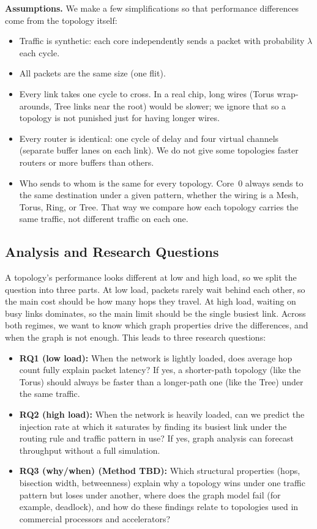 \documentclass[conference]{IEEEtran}
\begin{document}
\textbf{Assumptions.} We make a few simplifications so that
performance differences come from the topology itself:
\begin{itemize}
  \item Traffic is synthetic: each core independently sends a packet
  with probability $\lambda$ each cycle.
  \item All packets are the same size (one flit).
  \item Every link takes one cycle to cross. In a real chip, long wires
  (Torus wrap-arounds, Tree links near the root) would be slower; we
  ignore that so a topology is not punished just for having longer
  wires.
  \item Every router is identical: one cycle of delay and four virtual
  channels (separate buffer lanes on each link). We do not give some
  topologies faster routers or more buffers than others.
    \item Who sends to whom is the same for every topology. Core~0 always
  sends to the same destination under a given pattern, whether the
  wiring is a Mesh, Torus, Ring, or Tree. That way we compare how each
  topology carries the same traffic, not different traffic on each one.
\end{itemize}

\subsection{Analysis and Research Questions}


A topology's performance looks different at low and high load, so we split the question into three parts. At low load, packets rarely wait behind each other, so the main cost should be how many hops they travel. At high load, waiting on busy links dominates, so the main limit should be the single busiest link. Across both regimes, we want to know which graph properties drive the differences, and when the graph is not enough. This leads to three research questions:
\begin{itemize}
  \item \textbf{RQ1 (low load):} When the network is lightly loaded,
  does average hop count fully explain packet latency? If yes, a
  shorter-path topology (like the Torus) should always be faster than a longer-path one (like the Tree) under the same traffic.
  \item \textbf{RQ2 (high load):} When the network is heavily loaded, can we predict the injection rate at which it saturates by finding its busiest link under the routing rule and traffic pattern in use? If yes, graph analysis can forecast throughput without a full
  simulation.
\item \textbf{RQ3 (why/when) (Method TBD):} Which structural properties
  (hops, bisection width, betweenness) explain why a topology wins
  under one traffic pattern but loses under another, where does the
  graph model fail (for example, deadlock), and how do these findings relate to topologies used in commercial processors and accelerators? 
\end{itemize}
\end{document}
